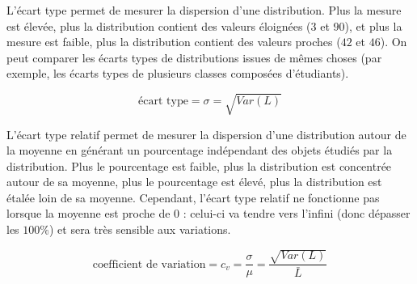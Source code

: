 \documentclass[11pt,a4paper]{article}
\begin{document}
\bigskip


\bigskip

L'écart type permet de mesurer la dispersion d'une distribution.
Plus la mesure est élevée, plus la distribution contient des valeurs éloignées ($ 3 $ et $ 90 $), et plus la mesure est faible, plus la distribution contient des valeurs proches ($ 42 $ et $ 46 $).
On peut comparer les écarts types de distributions issues de mêmes choses (par exemple, les écarts types de plusieurs classes composées d'étudiants).

\begin{center}
\begin{equation*}
\text{écart type} = \sigma = \sqrt{Var(L)}
\end{equation*}
\end{center}


\bigskip


\bigskip

L'écart type relatif permet de mesurer la dispersion d'une distribution autour de la moyenne en générant un pourcentage indépendant des objets étudiés par la distribution.
Plus le pourcentage est faible, plus la distribution est concentrée autour de sa moyenne, plus le pourcentage est élevé, plus la distribution est étalée loin de sa moyenne.
Cependant, l'écart type relatif ne fonctionne pas lorsque la moyenne est proche de $ 0 $ : celui-ci va tendre vers l'infini (donc dépasser les $ 100\% $) et sera très sensible aux variations.

\begin{center}
\begin{equation*}
\text{coefficient de variation} = c_{v} = \frac{\sigma}{\mu} = \frac{\sqrt{Var(L)}}{\bar{L}}
\end{equation*}
\end{center}

\end{document}
